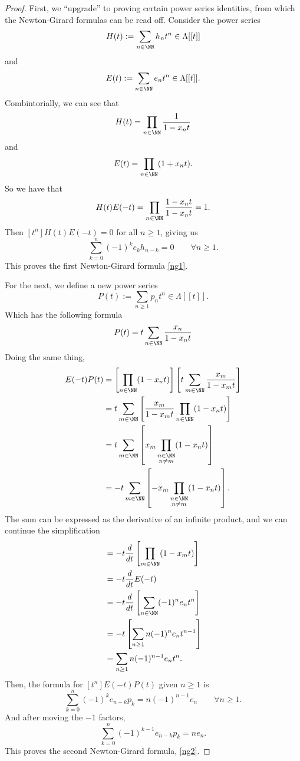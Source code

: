\documentclass{article}
\begin{document}
\begin{proof}
    First, we ``upgrade'' to proving certain power series identities, from which the Newton-Girard formulas can be read off. Consider the power series
    \[
        H(t) := \sum_{n\in\NN}h_n t^n \in \Lambda[[t]]
    \]
    and 
    \[
        E(t) := \sum_{n\in\NN}e_n t^n \in \Lambda[[t]].
    \]
    Combintorially, we can see that 
    \[
        H(t) = \prod_{n\in\NN}\frac{1}{1-x_nt}
    \]
    and
    \[
        E(t) = \prod_{n\in\NN}(1+x_nt).
    \]
    So we have that
    \[
        H(t)E(-t) = \prod_{n\in\NN}\frac{1-x_nt}{1-x_nt} = 1.
    \]
    Then $[t^n] H(t)E(-t) = 0$ for all $n \geq 1$, giving us
    \[
        \sum_{k=0}^n (-1)^k e_k h_{n-k} = 0 \qquad \forall n\geq 1.
    \]
    This proves the first Newton-Girard formula \eqref{ng1}.

    For the next, we define a new power series
    \[
        P(t) := \sum_{n\geq1}p_nt^n \in \Lambda[[t]].
    \]
    Which has the following formula
    \[
        P(t) = t\sum_{n\in\NN}\frac{x_n}{1-x_nt}
    \]
    Doing the same thing,
    \begin{align*}
        E(-t)P(t) &= \left[\prod_{n\in\NN}(1-x_nt)\right]\left[t\sum_{m\in\NN}\frac{x_m}{1-x_mt}\right] \\
                  &= t\sum_{m\in\NN}\left[\frac{x_m}{1-x_mt}\prod_{n\in\NN}(1-x_nt)\right] \\
                  &= t\sum_{m\in\NN} \left[x_m\prod_{\substack{n\in\NN \\ n\neq m}}(1-x_nt)\right] \\
                  &= -t\sum_{m\in\NN} \left[-x_m\prod_{\substack{n\in\NN \\ n\neq m}}(1-x_nt)\right].
    \end{align*}
    The sum can be expressed as the derivative of an infinite product, and we can continue the simplification
    \begin{align*}
                  &= -t\frac{d}{dt}\left[\prod_{m\in\NN}(1-x_mt)\right] \\
                  &= -t\frac{d}{dt}E(-t) \\
                  &= -t\frac{d}{dt}\left[\sum_{n\in\NN}(-1)^n e_nt^n\right] \\
                  &= -t\left[\sum_{n\geq 1}n(-1)^n e_nt^{n-1}\right] \\
                  &= \sum_{n\geq 1}n(-1)^{n-1} e_nt^n.
    \end{align*}
    Then, the formula for $[t^n]E(-t)P(t)$ given $n \geq 1$ is
    \[
        \sum_{k=0}^n (-1)^k e_{n-k}p_k = n(-1)^{n-1}e_n \qquad \forall n \geq 1.
    \]
    And after moving the $-1$ factors,
    \[
        \sum_{k=0}^n (-1)^{k-1} e_{n-k}p_k = ne_n.
    \]
    This proves the second Newton-Girard formula, \eqref{ng2}.


\end{proof}
\end{document}
